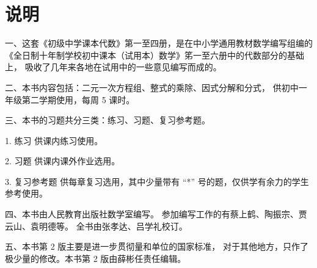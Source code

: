 
\chapter{说明}

一、这套《初级中学课本代数》第一至四册，是在中小学通用教材数学编写组编的
《全日制十年制学校初中课本（试用本）数学》笫一至六册中的代数部分的基础上，
吸收了几年来各地在试用中的一些意见编写而成的。

二、本书内容包括：二元一次方程组、整式的乘除、因式分解和分式，
供初中一年级第二学期使用，每周 5 课时。

三、本书的习题共分三类：练习、习题、复习参考题。

1. 练习 \quad 供课内练习使用。

2. 习题 \quad 供课内课外作业选用。

3. 复习参考题 \quad 供每章复习选用，其中少量带有 “*” 号的题，仅供学有余力的学生参考使用。

四、本书由人民教育出版社数学室编写。
参加编写工作的有蔡上鹤、陶振宗、贾云山、袁明德等。
全书由张孝达、吕学礼校订。

五、本书第 2 版主要是进一步贯彻量和单位的国家标准，
对于其他地方，只作了极少量的修改。本书第 2 版由薛彬任责任编辑。




